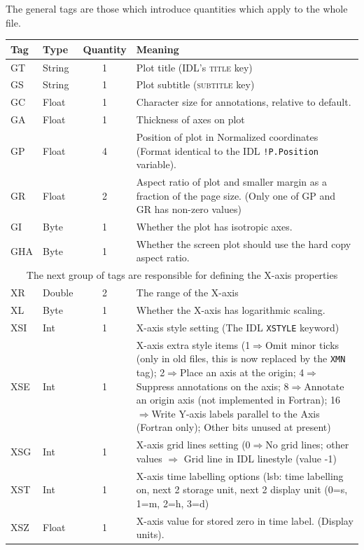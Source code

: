 \documentclass[english]{article}
\newcommand{\noun}[1]{\textsc{#1}}
\begin{document}
The general tags are those which introduce quantities which apply
to the whole file.

\begin{longtable}{|llcp{9cm}|}
  \hline Tag& Type& Quantity&
  Meaning\\
  \hline
  \endhead
  \hline
  \endfoot
  GT& String& 1&
  Plot title (IDL's \noun{title} key)\\
  GS& String& 1&
  Plot subtitle (\noun{subtitle} key)\\
  GC& Float& 1&
  Character size for annotations, relative to default.\\
  GA& Float & 1&
  Thickness of axes on plot\\
  GP& Float& 4& Position of plot in Normalized coordinates (Format
  identical to the
  IDL \texttt{!P.Position} variable).\\
  GR& Float& 2& Aspect ratio of plot and smaller margin as a fraction
  of the page
  size. (Only one of GP and GR has non-zero values)\\
  GI & Byte & 1 & Whether the plot has isotropic axes.\\
  GHA & Byte & 1 & Whether the screen plot should use the hard copy
  aspect ratio.\\
  \hline \multicolumn{4}{|c|}{The next group of tags are responsible
    for
    defining the X-axis properties}\\
  \hline XR& Double& 2&
  The range of the X-axis\\
  XL & Byte & 1 & Whether the X-axis has logarithmic scaling.\\
  XSI& Int& 1&
  X-axis style setting (The IDL \texttt{XSTYLE} keyword)\\
  XSE& Int& 1& X-axis extra style items (1$\Rightarrow$Omit minor ticks
  (only in old files, this is now replaced by the \texttt{XMN} tag);
  2$\Rightarrow$Place an axis at the origin; 4$\Rightarrow$Suppress
  annotations on the
  axis; 8$\Rightarrow$Annotate an origin axis (not implemented in
  Fortran); 16$\Rightarrow$Write Y-axis labels parallel to the Axis
  (Fortran only); Other bits unused at present)\\
  XSG& Int& 1& X-axis grid lines setting (0$\Rightarrow$No grid lines;
  other values
  $\Rightarrow$ Grid line in IDL linestyle (value -1)\\
  XST& Int& 1& X-axis time labelling options (lsb: time labelling on,
  next 2 storage
  unit, next 2 display unit (0=s, 1=m, 2=h, 3=d)\\
  XSZ& Float& 1&
  X-axis value for stored zero in time label. (Display units).\\

\end{longtable}
\end{document}
